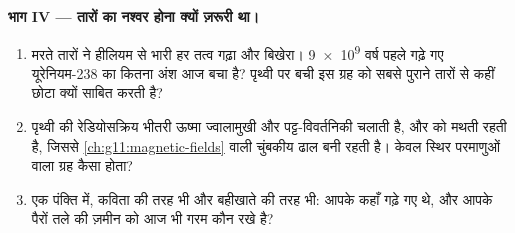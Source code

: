 \begin{problem}[{सप्ताहांत समस्या --- अस्थिर नाभिक के तीन पेशे: आधी होती
गिनतियों से आँकी गई एक ममी, यूरेनियम का संतुलित वंश-वृक्ष, एक धुआँ-संसूचक का
लेखा, और यह कि तारों का नश्वर होना क्यों ज़रूरी था}]
\medskip
\noindent\textbf{भाग IV --- तारों का नश्वर होना क्यों ज़रूरी था।}
\begin{enumerate}[resume]
  \item मरते तारों ने हीलियम से भारी हर तत्व गढ़ा और बिखेरा। \num{9e9} वर्ष
        पहले गढ़े गए यूरेनियम-238 का कितना अंश आज बचा है? पृथ्वी पर बची 
        इस ग्रह को सबसे पुराने तारों से कहीं छोटा क्यों साबित करती है?
  \item पृथ्वी की रेडियोसक्रिय भीतरी ऊष्मा ज्वालामुखी और पट्ट-विवर्तनिकी
        चलाती है, और  को मथती रहती है, जिससे \cref{ch:g11:magnetic-fields} वाली चुंबकीय ढाल
        बनी रहती है। केवल स्थिर परमाणुओं वाला ग्रह कैसा होता?
  \item एक पंक्ति में, कविता की तरह भी और बहीखाते की तरह भी: आपके
         कहाँ गढ़े गए थे, और आपके पैरों तले की ज़मीन को आज भी
        गरम कौन रखे है?
\end{enumerate}
\end{problem}
